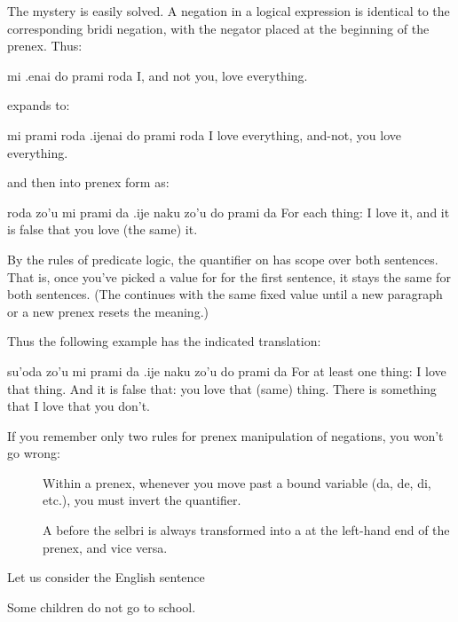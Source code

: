 The mystery is easily solved. A negation in a logical
    expression is identical to the corresponding bridi negation,
    with the negator placed at the beginning of the prenex.
    Thus:
\begin{example}
mi .enai do prami roda\n
I, and not you, love everything.
\end{example}

{\noindent}expands to:
\begin{example}
mi prami roda  .ijenai do prami roda\n
I love everything, and-not, you love everything.
\end{example}

{\noindent}and then into prenex form as:
\begin{example}
roda zo'u mi prami da\n
\T	.ije naku zo'u do prami da\n
For each thing: I love it,\n
\T	and it is false that you love (the same) it.
\end{example}

By the rules of predicate logic, the  quantifier on
     has scope over both sentences. That is, once you've
    picked a value for  for the first sentence, it stays the
    same for both sentences. (The  continues with the same
    fixed value until a new paragraph or a new prenex resets the
    meaning.) 

Thus the following example has the indicated
    translation:
\begin{example}
su'oda zo'u mi prami da\n
\T	.ije naku zo'u do prami da\n
For at least one thing: I love that thing.\n
\T	And it is false that: you love that (same) thing.\n
There is something that I love that you don't.
\end{example}

If you remember only two rules for prenex manipulation of
    negations, you won't go wrong: 
\begin{description}
\item[] Within a prenex, whenever you move  past a bound variable (da, de, di, etc.), you must invert the quantifier.
\item[] A  before the selbri is always transformed into a  at the left-hand end of the prenex, and vice versa.
\end{description}




Let us consider the English sentence
\begin{example}
Some children do not go to school.
\end{example}

